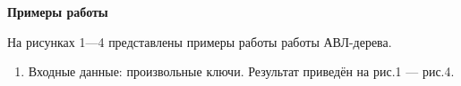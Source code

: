 \documentclass[12pt, a4paper]{article}
\begin{document}
\newpage
\begin{center}
	\textbf{Примеры работы}
\end{center}
На рисунках 1---4 представлены примеры работы работы АВЛ-дерева.
\begin{enumerate}
	\item Входные данные: произвольные ключи.
	Результат приведён на рис.1 --- рис.4.
	\begin{figure}[h]

\end{figure}
\end{enumerate}
\end{document}
